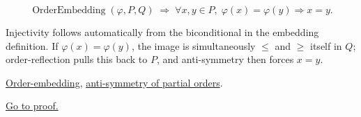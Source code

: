 \begin{remark*}
\[
\operatorname{OrderEmbedding}(\varphi, P, Q)
\;\Longrightarrow\;
\forall x, y \in P,\; \varphi(x) = \varphi(y) \Rightarrow x = y.
\]
\end{remark*}

\begin{remark*}[Interpretation]
Injectivity follows automatically from the biconditional in the embedding
definition.  If $\varphi(x) = \varphi(y)$, the image is simultaneously
$\leq$ and $\geq$ itself in $Q$; order-reflection pulls this back to $P$,
and anti-symmetry then forces $x = y$.
\end{remark*}

\begin{remark*}[Dependencies]
\hyperref[def:order-embedding]{Order-embedding},
\hyperref[def:partial-order]{anti-symmetry of partial orders}.
\end{remark*}

\begin{remark*}[Proof]
\hyperref[prf:order-embedding-injective]{Go to proof.}
\end{remark*}
